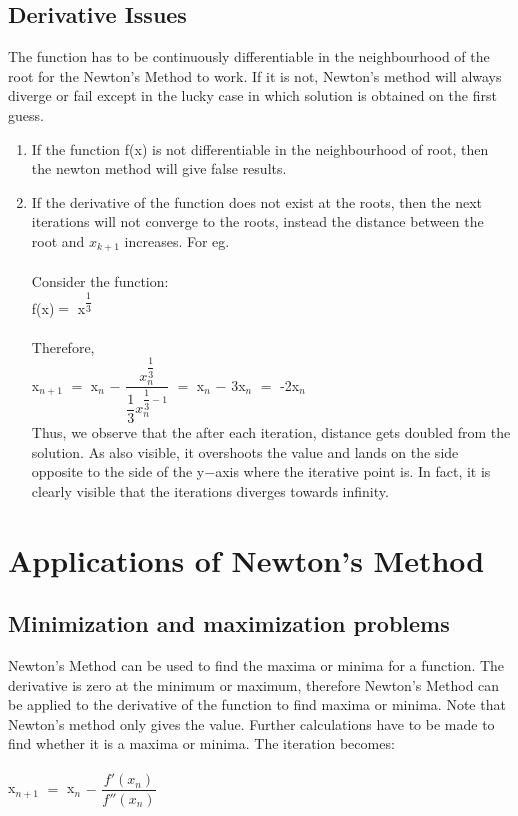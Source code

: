 \documentclass[15pt]{report}
\begin{document}
\subsection*{Derivative Issues}
The function has to be continuously differentiable in the neighbourhood of the root for the Newton's Method to work. If it is not, Newton's method will always diverge or fail except in the lucky case in which solution is obtained on the first guess.
\begin{enumerate}
\item If the function f(x) is not differentiable in the neighbourhood of root, then the newton method will give false results.\\
\item If the derivative of the function does not exist at the roots, then the next iterations will not converge to the roots, instead the distance between the root and $x_{k+1}$ increases. For eg. \\ \\
Consider the function:\\ 
f(x)$=$ x$^{\dfrac{1}{3}}$\\ \\
Therefore,\\
x$_{n+1}$ $=$ x$_{n}$ $-$ $\dfrac{x_n^{\dfrac{1}{3}}}{\dfrac{1}{3}x_n^{\dfrac{1}{3}-1}}$ $=$ x$_{n}$ $-$ 3x$_{n}$ $=$ -2x$_{n}$\\
Thus, we observe that the after each iteration, distance gets doubled from the solution. As also visible, it overshoots the value  and lands on the side opposite to the side of the y$-$axis where the iterative point is. In fact, it is clearly visible that the iterations diverges towards infinity.
\end{enumerate}

\section*{Applications of Newton's Method}
\subsection*{Minimization and maximization problems}
Newton's Method can be used to find the maxima or minima  for a function. The derivative is zero at the minimum or maximum, therefore Newton's Method can be applied to the derivative of the function to find maxima or minima. Note that Newton's method only gives the value. Further calculations have to be made to find whether it is a maxima or minima. The iteration becomes:\\ \\
x$_{n+1}$ $=$ x$_{n}$ $-$ $\dfrac{f'(x_{n})}{f''(x_{n})}$\\
\end{document}
